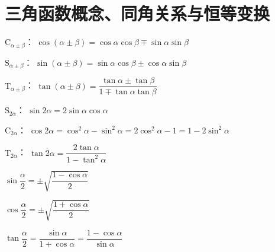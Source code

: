 \section{三角函数概念、同角关系与恒等变换}
  \begin{description}[leftmargin=0pt,labelsep=0pt]
    \item%
      \begin{itemizeMy}
        \item $\mathrm{C}_{\alpha\pm\beta}$：
        $\cos(\alpha\pm\beta)=\cos\alpha\cos\beta \mp \sin\alpha\sin\beta$
        \item $\mathrm{S}_{\alpha\pm\beta}$：
        $\sin(\alpha\pm\beta)=\sin\alpha\cos\beta \pm \cos\alpha\sin\beta$
        \item $\mathrm{T}_{\alpha\pm\beta}$：
        $\tan(\alpha\pm\beta)=\dfrac{\tan\alpha\pm \tan\beta}{1\mp\tan\alpha\tan\beta}$
      \end{itemizeMy}
    \item%
      \begin{itemizeMy}
        \item $\mathrm{S}_{2\alpha}$：
        $\sin{2\alpha}=2\sin\alpha\cos\alpha$
        \item $\mathrm{C}_{2\alpha}$：
        $\cos{2\alpha}=\cos^2{\alpha}-\sin^2{\alpha}=2\cos^2\alpha-1=1-2\sin^2\alpha$
        \item $\mathrm{T}_{2\alpha}$：
        $\tan{2\alpha}=\dfrac{2\tan\alpha}{1-\tan^2\alpha}$
      \end{itemizeMy}
      \item%
        \begin{itemizeMy}
          \item
          $\sin{\dfrac{\alpha}2}=\pm\sqrt{\dfrac{1-\cos\alpha}2}$
          \item $\cos{\dfrac{\alpha}2}=\pm\sqrt{\dfrac{1+\cos\alpha}2}$
          \item $\tan{\dfrac{\alpha}2}=\dfrac{\sin\alpha}{1+\cos\alpha}=\dfrac{1-\cos\alpha}{\sin\alpha}$
        \end{itemizeMy}

\end{description}
